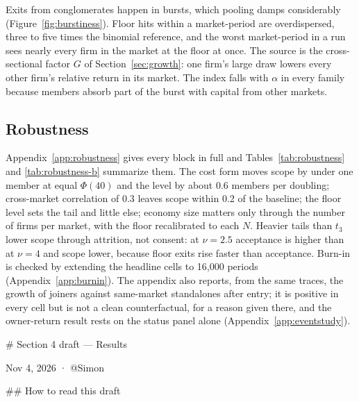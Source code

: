 Exits from conglomerates happen in bursts, which pooling damps considerably (Figure~\ref{fig:burstiness}). Floor hits within a market-period are overdispersed, three to five times the binomial reference, and the worst market-period in a run sees nearly every firm in the market at the floor at once. The source is the cross-sectional factor $G$ of Section~\ref{sec:growth}: one firm's large draw lowers every other firm's relative return in its market. The index falls with $\alpha$ in every family because members absorb part of the burst with capital from other markets.



\subsection{Robustness}\label{sec:results-robustness}

Appendix~\ref{app:robustness} gives every block in full and Tables~\ref{tab:robustness} and \ref{tab:robustness-b} summarize them. The cost form moves scope by under one member at equal $\Phi(40)$ and the level by about 0.6 members per doubling; cross-market correlation of 0.3 leaves scope within 0.2 of the baseline; the floor level sets the tail and little else; economy size matters only through the number of firms per market, with the floor recalibrated to each $N$. Heavier tails than $t_3$ lower scope through attrition, not consent: at $\nu = 2.5$ acceptance is higher than at $\nu = 4$ and scope lower, because floor exits rise faster than acceptance. Burn-in is checked by extending the headline cells to 16,000 periods (Appendix~\ref{app:burnin}). The appendix also reports, from the same traces, the growth of joiners against same-market standalones after entry; it is positive in every cell but is not a clean counterfactual, for a reason given there, and the owner-return result rests on the status panel alone (Appendix~\ref{app:eventstudy}).

\iffalse
# Section 4 draft — Results

Nov 4, 2026 · @Simon

## How to read this draft

